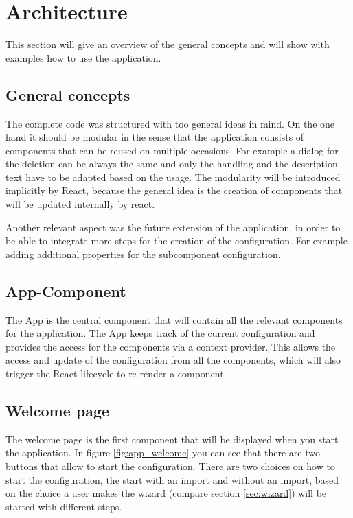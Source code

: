 \section{Architecture}
\label{sec:architecture}
This section will give an overview of the general concepts and will show with examples how to use the application.

\subsection{General concepts}
The complete code was structured with too general ideas in mind. On the one hand it should be modular in the sense that the application consists of components that can be reused on multiple occasions. For example a dialog for the deletion can be always the same and only the handling and the description text have to be adapted based on the usage. The modularity will be introduced implicitly by React, because the general idea is the creation of components that will be updated internally by react.

Another relevant aspect was the future extension of the application, in order to be able to integrate more steps for the creation of the configuration. For example adding additional properties for the subcomponent configuration.

\subsection{App-Component}
The App is the central component that will contain all the relevant components for the application. The App keeps track of the current configuration and provides the access for the components via a context provider. This allows the access and update of the configuration from all the components, which will also trigger the React lifecycle to re-render a component.

\subsection{Welcome page}
The welcome page is the first component that will be displayed when you start the application.
In figure \ref{fig:app_welcome} you can see that there are two buttons that allow to start the configuration. There are two choices on how to start the configuration, the start with an import and without an import, based on the choice a user makes the wizard (compare section \ref{sec:wizard}) will be started with different steps.

